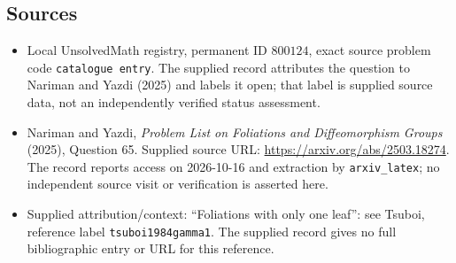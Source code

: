 \documentclass[11pt]{article}
\begin{document}
\subsection{Sources}
\begin{itemize}
\item Local UnsolvedMath registry, permanent ID \(800124\), exact source problem code \texttt{catalogue entry}. The supplied record attributes the question to Nariman and Yazdi (2025) and labels it open; that label is supplied source data, not an independently verified status assessment.
\item Nariman and Yazdi, \emph{Problem List on Foliations and Diffeomorphism Groups} (2025), Question 65. Supplied source URL: \url{https://arxiv.org/abs/2503.18274}. The record reports access on 2026-10-16 and extraction by \texttt{arxiv\_latex}; no independent source visit or verification is asserted here.
\item Supplied attribution/context: ``Foliations with only one leaf'': see Tsuboi, reference label \texttt{tsuboi1984gamma1}. The supplied record gives no full bibliographic entry or URL for this reference.
\end{itemize}
\end{document}
